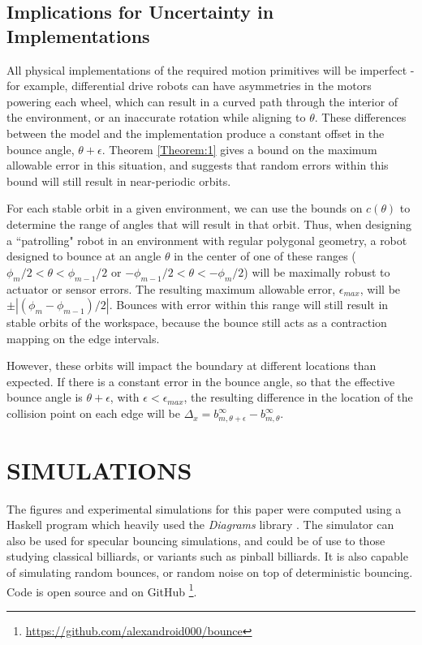 \documentclass[letterpaper, 10 pt, conference]{ieeeconf}  %
\begin{document}
\subsection{Implications for Uncertainty in Implementations}
All physical implementations of the required motion primitives
will be imperfect - for example, differential drive robots can have asymmetries
in the motors powering each wheel, which can result in a curved path
through the interior of the environment, or an inaccurate rotation
while aligning to $\theta$. These differences between the model and 
the implementation produce a constant offset in the bounce angle, $\theta + \epsilon$. 
Theorem \ref{Theorem:1} gives a bound on the maximum allowable error in this
situation, and suggests that random errors within this bound will still result
in near-periodic orbits.

For each stable orbit in a given environment, we can use the bounds on
$c(\theta)$ to determine the range of angles that will result in that orbit. 
Thus, when designing a ``patrolling" robot in an environment with regular polygonal
geometry, a robot designed to bounce at an angle $\theta$ in the center of one of these
ranges ($ \phi_m/2< \theta < \phi_{m-1}/2$ or $-\phi_{m-1}/2 < \theta <
-\phi_m/2$) will be maximally robust to actuator or sensor errors. The resulting
maximum allowable error, $\epsilon_{max}$, will be $\pm | (\phi_m - \phi_{m-1})/2 |$.
Bounces with error within this range will still result in stable orbits of the
workspace, because the bounce still acts as a contraction mapping on the edge
intervals.

However, these orbits will impact the boundary at
different locations than expected. If there is a constant error in the bounce
angle, so that the effective bounce angle is $\theta + \epsilon$, with $\epsilon
< \epsilon_{max}$, the resulting difference in the location of the collision point
on each edge will be $\Delta_x = b_{m,\theta + \epsilon}^{\infty} - b_{m,\theta}^{\infty}$.


\section{SIMULATIONS}
The figures and experimental simulations for this paper were computed using a
Haskell program which heavily used the
\textit{Diagrams} library \cite{yorgey2012monoids}. 
The simulator can also be used for specular bouncing simulations, and could be
of use to those studying classical billiards, or variants such as pinball billiards.
It is also capable of simulating random bounces, or random noise on top of  
deterministic bouncing. Code is open source and on GitHub
\footnote{\url{https://github.com/alexandroid000/bounce}}.
\end{document}
